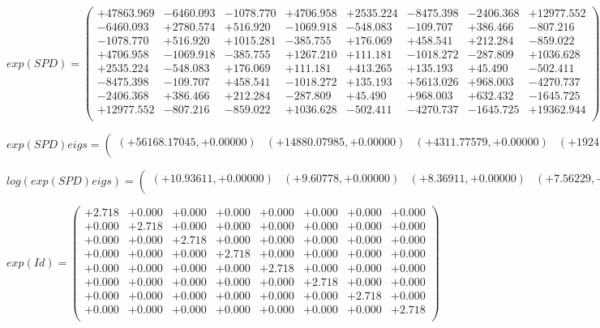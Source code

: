\documentclass[9pt]{article}
\theoremstyle{plain}
\theoremstyle{definition}
\theoremstyle{remark}
\numberwithin{equation}{section}
\begin{document}
$exp(SPD) = \left(
\begin{array}{
cccccccc}
+47863.969 & -6460.093 & -1078.770 & +4706.958 & +2535.224 & -8475.398 & -2406.368 & +12977.552 \\
-6460.093 & +2780.574 & +516.920 & -1069.918 & -548.083 & -109.707 & +386.466 & -807.216 \\
-1078.770 & +516.920 & +1015.281 & -385.755 & +176.069 & +458.541 & +212.284 & -859.022 \\
+4706.958 & -1069.918 & -385.755 & +1267.210 & +111.181 & -1018.272 & -287.809 & +1036.628 \\
+2535.224 & -548.083 & +176.069 & +111.181 & +413.265 & +135.193 & +45.490 & -502.411 \\
-8475.398 & -109.707 & +458.541 & -1018.272 & +135.193 & +5613.026 & +968.003 & -4270.737 \\
-2406.368 & +386.466 & +212.284 & -287.809 & +45.490 & +968.003 & +632.432 & -1645.725 \\
+12977.552 & -807.216 & -859.022 & +1036.628 & -502.411 & -4270.737 & -1645.725 & +19362.944 \\
\end{array}
\right)$ \newline 

$exp(SPD) eigs = \left(
\begin{array}{
cccccccc}
(+56168.17045,+0.00000) & (+14880.07985,+0.00000) & (+4311.77579,+0.00000) & (+1924.25027,+0.00000) & (+69.17669,+0.00000) & (+339.64809,+0.00000) & (+693.66208,+0.00000) & (+561.93669,+0.00000) \\
\end{array}
\right)$ \newline 

$log(exp(SPD) eigs)  = \left(
\begin{array}{
cccccccc}
(+10.93611,+0.00000) & (+9.60778,+0.00000) & (+8.36911,+0.00000) & (+7.56229,+0.00000) & (+4.23666,+0.00000) & (+5.82791,+0.00000) & (+6.54198,+0.00000) & (+6.33139,+0.00000) \\
\end{array}
\right)$ \newline 

$exp(Id) = \left(
\begin{array}{
cccccccc}
+2.718 & +0.000 & +0.000 & +0.000 & +0.000 & +0.000 & +0.000 & +0.000 \\
+0.000 & +2.718 & +0.000 & +0.000 & +0.000 & +0.000 & +0.000 & +0.000 \\
+0.000 & +0.000 & +2.718 & +0.000 & +0.000 & +0.000 & +0.000 & +0.000 \\
+0.000 & +0.000 & +0.000 & +2.718 & +0.000 & +0.000 & +0.000 & +0.000 \\
+0.000 & +0.000 & +0.000 & +0.000 & +2.718 & +0.000 & +0.000 & +0.000 \\
+0.000 & +0.000 & +0.000 & +0.000 & +0.000 & +2.718 & +0.000 & +0.000 \\
+0.000 & +0.000 & +0.000 & +0.000 & +0.000 & +0.000 & +2.718 & +0.000 \\
+0.000 & +0.000 & +0.000 & +0.000 & +0.000 & +0.000 & +0.000 & +2.718 \\
\end{array}
\right)$ \newline 
\end{document}
